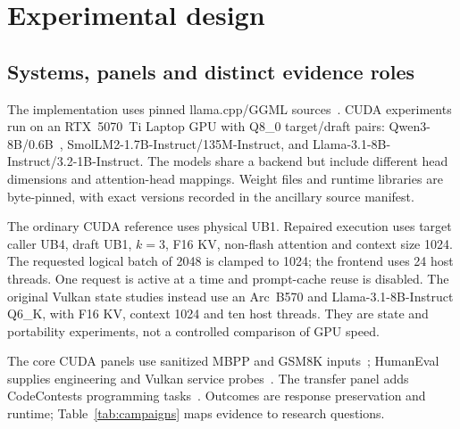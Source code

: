 \section{Experimental design}
\label{sec:experiments}
\subsection{Systems, panels and distinct evidence roles}
The implementation uses pinned llama.cpp/GGML sources~\cite{llamacpp,studyrecords}. CUDA experiments run on an RTX~5070~Ti Laptop GPU with Q8\_0 target/draft pairs: Qwen3-8B/0.6B~\cite{qwen3}, SmolLM2-1.7B-Instruct/135M-Instruct, and Llama-3.1-8B-Instruct/3.2-1B-Instruct. The models share a backend but include different head dimensions and attention-head mappings. Weight files and runtime libraries are byte-pinned, with exact versions recorded in the ancillary source manifest.

The ordinary CUDA reference uses physical UB1. Repaired execution uses target caller UB4, draft UB1, $k=3$, F16 KV, non-flash attention and context size 1024. The requested logical batch of 2048 is clamped to 1024; the frontend uses 24 host threads. One request is active at a time and prompt-cache reuse is disabled. The original Vulkan state studies instead use an Arc~B570 and Llama-3.1-8B-Instruct Q6\_K, with F16 KV, context 1024 and ten host threads. They are state and portability experiments, not a controlled comparison of GPU speed.

The core CUDA panels use sanitized MBPP and GSM8K inputs~\cite{mbpp,gsm8k}; HumanEval supplies engineering and Vulkan service probes~\cite{humaneval}. The transfer panel adds CodeContests programming tasks~\cite{rtxtransferrecords}. Outcomes are response preservation and runtime; Table~\ref{tab:campaigns} maps evidence to research questions.

